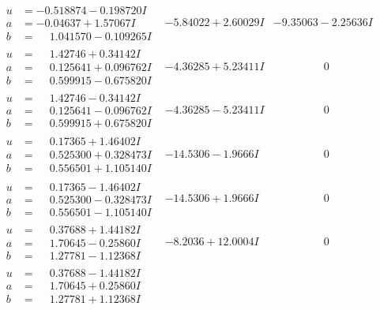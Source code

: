 \documentclass[1p]{elsarticle_modified}
\theoremstyle{definition}
\begin{document}
$$\begin{array}{c|c|c}
\begin{aligned}
u &= -0.518874 - 0.198720 I \\
a &= -0.04637 + 1.57067 I \\
b &= \phantom{-}1.041570 - 0.109265 I\end{aligned}
 & -5.84022 + 2.60029 I & -9.35063 - 2.25636 I \\ \hline\begin{aligned}
u &= \phantom{-}1.42746 + 0.34142 I \\
a &= \phantom{-}0.125641 + 0.096762 I \\
b &= \phantom{-}0.599915 - 0.675820 I\end{aligned}
 & -4.36285 + 5.23411 I & \phantom{-0.000000 } 0 \\ \hline\begin{aligned}
u &= \phantom{-}1.42746 - 0.34142 I \\
a &= \phantom{-}0.125641 - 0.096762 I \\
b &= \phantom{-}0.599915 + 0.675820 I\end{aligned}
 & -4.36285 - 5.23411 I & \phantom{-0.000000 } 0 \\ \hline\begin{aligned}
u &= \phantom{-}0.17365 + 1.46402 I \\
a &= \phantom{-}0.525300 + 0.328473 I \\
b &= \phantom{-}0.556501 + 1.105140 I\end{aligned}
 & -14.5306 - 1.9666 I & \phantom{-0.000000 } 0 \\ \hline\begin{aligned}
u &= \phantom{-}0.17365 - 1.46402 I \\
a &= \phantom{-}0.525300 - 0.328473 I \\
b &= \phantom{-}0.556501 - 1.105140 I\end{aligned}
 & -14.5306 + 1.9666 I & \phantom{-0.000000 } 0 \\ \hline\begin{aligned}
u &= \phantom{-}0.37688 + 1.44182 I \\
a &= \phantom{-}1.70645 - 0.25860 I \\
b &= \phantom{-}1.27781 - 1.12368 I\end{aligned}
 & -8.2036 + 12.0004 I & \phantom{-0.000000 } 0 \\ \hline\begin{aligned}
u &= \phantom{-}0.37688 - 1.44182 I \\
a &= \phantom{-}1.70645 + 0.25860 I \\
b &= \phantom{-}1.27781 + 1.12368 I\end{aligned}

\end{array}$$
\end{document}
